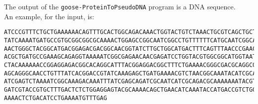 The output of the \texttt{goose-ProteinToPseudoDNA} program is a DNA sequence.\\
An example, for the input, is:
\begin{lstlisting}
ATCCCGTTTCTGCTGAAAAAACAGTTTGCACTGGCAGACAAACTGGTACTGTCTAAACTGCGTCAGCTGCTGGGCGGCCG
TATCAAAATGATGCCGTGCGGCGGCGCAAAACTGGAGCCGGCAATCGGCCTGTTTTTTCATGCAATCGGCATCAACATCA
AACTGGGCTACGGCATGACGGAGACGACGGCAACGGTATCTTGCTGGCATGACTTTCAGTTTAACCCGAACTCTATCGGC
ACGCTGATGCCGAAAGCAGAGGTAAAAATCGGCGAGAACAACGAGATCCTGGTACGTGGCGGCATGGTAATGAAAGGCTA
CTACAAAAAACCGGAGGAGACGGCACAGGCATTTACGGAGGACGGCTTTCTGAAAACGGGCGACGCAGGCGAGTTTGACG
AGCAGGGCAACCTGTTTATCACGGACCGTATCAAAGAGCTGATGAAAACGTCTAACGGCAAATACATCGCACCGCAGTAC
ATCGAGTCTAAAATCGGCAAAGACAAATTTATCGAGCAGATCGCAATCATCGCAGACGCAAAAAAATACGTATCTGCACT
GATCGTACCGTGCTTTGACTCTCTGGAGGAGTACGCAAAACAGCTGAACATCAAATACCATGACCGTCTGGAGCTGCTGA
AAAACTCTGACATCCTGAAAATGTTTGAG
\end{lstlisting}
